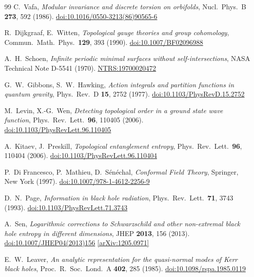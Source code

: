 \documentclass[11pt,a4paper]{article}
\begin{document}
\begin{thebibliography}{99}
  C.~Vafa,
  \textit{Modular invariance and discrete torsion on orbifolds},
  Nucl.\ Phys.\ B \textbf{273}, 592 (1986).
  \href{https://doi.org/10.1016/0550-3213(86)90565-6}{doi:10.1016/0550-3213(86)90565-6}

  R.~Dijkgraaf, E.~Witten,
  \textit{Topological gauge theories and group cohomology},
  Commun.\ Math.\ Phys.\ \textbf{129}, 393 (1990).
  \href{https://doi.org/10.1007/BF02096988}{doi:10.1007/BF02096988}

  A.~H.~Schoen,
  \textit{Infinite periodic minimal surfaces without self-intersections},
  NASA Technical Note D-5541 (1970).
  \href{https://ntrs.nasa.gov/citations/19700020472}{NTRS:19700020472}

  G.~W.~Gibbons, S.~W.~Hawking,
  \textit{Action integrals and partition functions in quantum gravity},
  Phys.\ Rev.\ D \textbf{15}, 2752 (1977).
  \href{https://doi.org/10.1103/PhysRevD.15.2752}{doi:10.1103/PhysRevD.15.2752}

  M.~Levin, X.-G.~Wen,
  \textit{Detecting topological order in a ground state wave function},
  Phys.\ Rev.\ Lett.\ \textbf{96}, 110405 (2006).
  \href{https://doi.org/10.1103/PhysRevLett.96.110405}{doi:10.1103/PhysRevLett.96.110405}

  A.~Kitaev, J.~Preskill,
  \textit{Topological entanglement entropy},
  Phys.\ Rev.\ Lett.\ \textbf{96}, 110404 (2006).
  \href{https://doi.org/10.1103/PhysRevLett.96.110404}{doi:10.1103/PhysRevLett.96.110404}

  P.~Di Francesco, P.~Mathieu, D.~S\'en\'echal,
  \textit{Conformal Field Theory},
  Springer, New York (1997).
  \href{https://doi.org/10.1007/978-1-4612-2256-9}{doi:10.1007/978-1-4612-2256-9}

  D.~N.~Page,
  \textit{Information in black hole radiation},
  Phys.\ Rev.\ Lett.\ \textbf{71}, 3743 (1993).
  \href{https://doi.org/10.1103/PhysRevLett.71.3743}{doi:10.1103/PhysRevLett.71.3743}

  A.~Sen,
  \textit{Logarithmic corrections to Schwarzschild and other non-extremal
    black hole entropy in different dimensions},
  JHEP \textbf{2013}, 156 (2013).
  \href{https://doi.org/10.1007/JHEP04(2013)156}{doi:10.1007/JHEP04(2013)156}
  \href{https://arxiv.org/abs/1205.0971}{[arXiv:1205.0971]}

  E.~W.~Leaver,
  \textit{An analytic representation for the quasi-normal modes of Kerr black holes},
  Proc.\ R.\ Soc.\ Lond.\ A \textbf{402}, 285 (1985).
  \href{https://doi.org/10.1098/rspa.1985.0119}{doi:10.1098/rspa.1985.0119}


\end{thebibliography}
\end{document}
